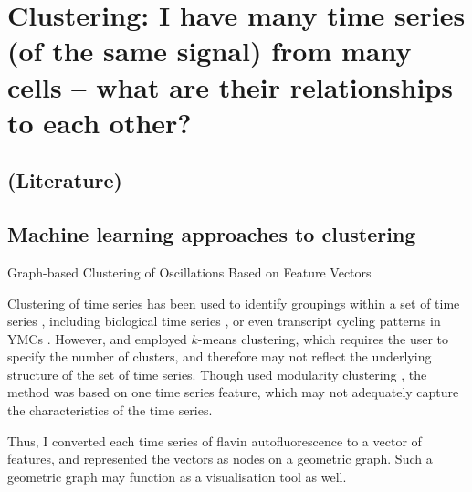 \section{Clustering: I have many time series (of the same signal) from many cells -- what are their relationships to each other?}
\label{sec:analysis-clustering}

\subsection{(Literature)}
\label{subsec:analysis-clustering-literature}

\subsection{Machine learning approaches to clustering}
\label{subsec:analysis-clustering-ml}

Graph-based Clustering of Oscillations Based on Feature Vectors

Clustering of time series has been used to identify groupings within a set of time series \citep{wangStructureBasedStatisticalFeatures2007}, including biological time series \citep{shafieiDopamineSignalingModulates2019}, or even transcript cycling patterns in YMCs \citep{tuLogicYeastMetabolic2005}.
However, \citet{wangStructureBasedStatisticalFeatures2007} and \citet{tuLogicYeastMetabolic2005} employed $k$-means clustering, which requires the user to specify the number of clusters, and therefore may not reflect the underlying structure of the set of time series.
Though \citet{shafieiDopamineSignalingModulates2019} used modularity clustering \citep{newmanModularityCommunityStructure2006}, the method was based on one time series feature, which may not adequately capture the characteristics of the time series.

Thus, I converted each time series of flavin autofluorescence to a vector of features, and represented the vectors as nodes on a geometric graph.
Such a geometric graph may function as a visualisation tool as well.


